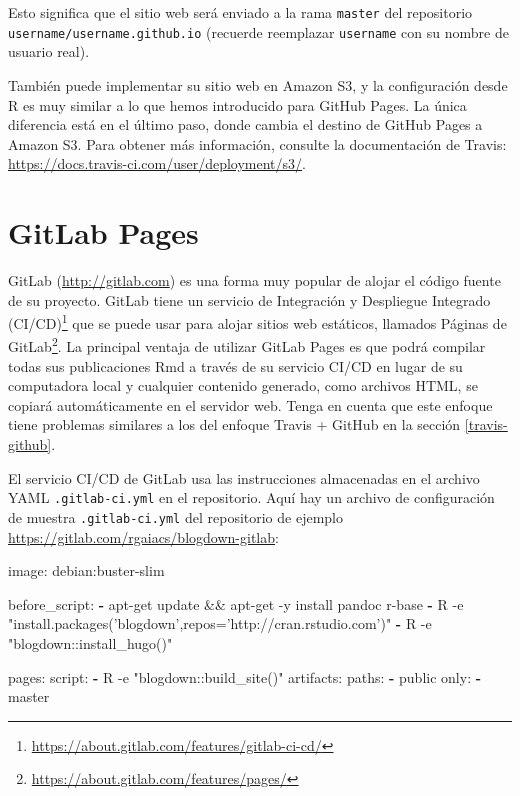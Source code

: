 \documentclass[12pt,]{krantz}
\makeatletter
\newenvironment{Shaded}{\begin{snugshade}}{\end{snugshade}}
\newcommand{\AttributeTok}[1]{\textcolor[rgb]{0.77,0.63,0.00}{#1}}
\newcommand{\FunctionTok}[1]{\textcolor[rgb]{0.00,0.00,0.00}{#1}}
\newcommand{\KeywordTok}[1]{\textcolor[rgb]{0.13,0.29,0.53}{\textbf{#1}}}
\newcommand{\NormalTok}[1]{#1}
\renewcommand{\href}[2]{#2\footnote{\url{#1}}}
\newenvironment{kframe}{%
\medskip{}
\setlength{\fboxsep}{.8em}
 \def\at@end@of@kframe{}%
 \ifinner\ifhmode%
  \def\at@end@of@kframe{\end{minipage}}%
  \begin{minipage}{\columnwidth}%
 \fi\fi%
 \def\FrameCommand##1{\hskip\@totalleftmargin \hskip-\fboxsep
 \colorbox{shadecolor}{##1}\hskip-\fboxsep
     \hskip-\linewidth \hskip-\@totalleftmargin \hskip\columnwidth}%
 \MakeFramed {\advance\hsize-\width
   \@totalleftmargin\z@ \linewidth\hsize
   \@setminipage}}%
 {\par\unskip\endMakeFramed%
 \at@end@of@kframe}
\renewenvironment{Shaded}{\begin{kframe}}{\end{kframe}}
\theoremstyle{definition}
\theoremstyle{definition}
\theoremstyle{definition}
\theoremstyle{remark}
\makeatother
\begin{document}
Esto significa que el sitio web será enviado a la rama \texttt{master}
del repositorio \texttt{username/username.github.io} (recuerde
reemplazar \texttt{username} con su nombre de usuario real).

También puede implementar su sitio web en Amazon S3, y
la configuración desde R es muy similar a lo que hemos introducido para
GitHub Pages. La única diferencia está en el último paso, donde cambia
el destino de GitHub Pages a Amazon S3. Para obtener más información,
consulte la documentación de Travis:
\url{https://docs.travis-ci.com/user/deployment/s3/}.

\hypertarget{gitlab-pages}{%
\section{GitLab Pages}\label{gitlab-pages}}

GitLab (\url{http://gitlab.com}) es una forma muy popular de alojar el
código fuente de su proyecto. GitLab tiene un
\href{https://about.gitlab.com/features/gitlab-ci-cd/}{servicio de
Integración y Despliegue Integrado (CI/CD)} que se puede usar para
alojar sitios web estáticos, llamados
\href{https://about.gitlab.com/features/pages/}{Páginas de GitLab}. La
principal ventaja de utilizar GitLab Pages es que podrá compilar todas
sus publicaciones Rmd a través de su servicio CI/CD en lugar de su
computadora local y cualquier contenido generado, como archivos HTML, se
copiará automáticamente en el servidor web. Tenga en cuenta que este
enfoque tiene problemas similares a los del enfoque Travis + GitHub en
la sección \ref{travis-github}.

El servicio CI/CD de GitLab usa las instrucciones almacenadas en el
archivo YAML \texttt{.gitlab-ci.yml} en el repositorio. Aquí hay un
archivo de configuración de muestra \texttt{.gitlab-ci.yml} del
repositorio de ejemplo \url{https://gitlab.com/rgaiacs/blogdown-gitlab}:

\begin{Shaded}
\begin{Highlighting}[]
\FunctionTok{image:}\AttributeTok{ debian:buster-slim}

\FunctionTok{before_script:}
  \KeywordTok{-}\NormalTok{ apt-get update && apt-get -y install pandoc r-base}
  \KeywordTok{-} \FunctionTok{R -e "install.packages('blogdown',repos='http:}\AttributeTok{//cran.rstudio.com')"}
  \KeywordTok{-} \FunctionTok{R -e "blogdown:}\AttributeTok{:install_hugo()"}

\FunctionTok{pages:}
  \FunctionTok{script:}
    \KeywordTok{-} \FunctionTok{R -e "blogdown:}\AttributeTok{:build_site()"}
  \FunctionTok{artifacts:}
    \FunctionTok{paths:}
      \KeywordTok{-}\NormalTok{ public}
  \FunctionTok{only:}
    \KeywordTok{-}\NormalTok{ master}
\end{Highlighting}
\end{Shaded}
\end{document}
